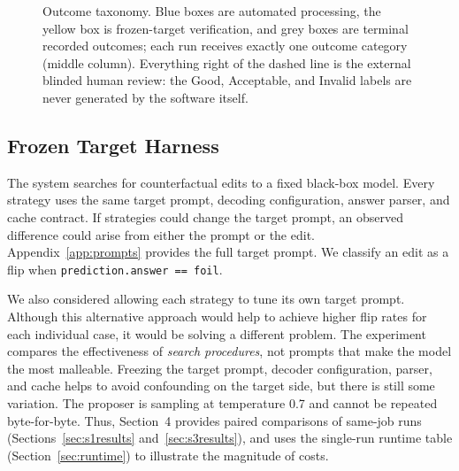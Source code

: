 \documentclass[11pt,a4paper]{article}
\begin{document}
\begin{figure}[htbp]
\caption{Outcome taxonomy. Blue boxes are automated processing, the yellow box is
frozen-target verification, and grey boxes are terminal recorded outcomes; each run
receives exactly one outcome category (middle column). Everything right of the
dashed line is the external blinded human review: the Good, Acceptable, and Invalid
labels are never generated by the software itself.}
\label{fig:taxonomy}
\end{figure}

\subsection{Frozen Target Harness}
\label{sec:harness}

The system searches for counterfactual edits to a fixed black-box model. Every
strategy uses the same target prompt, decoding configuration, answer parser, and
cache contract. If strategies could change the target prompt, an observed difference
could arise from either the prompt or the edit. Appendix~\ref{app:prompts} provides
the full target prompt. We classify an edit as a flip when
\texttt{prediction.answer == foil}.

We also considered allowing each strategy to tune its own target prompt. Although
this alternative approach would help to achieve higher flip rates for each
individual case, it would be solving a different problem. The experiment
compares the effectiveness of \emph{search procedures}, not prompts that make the
model the most malleable. Freezing the target prompt, decoder configuration,
parser, and cache helps to avoid confounding on the target side, but there is still
some variation. The proposer is sampling at temperature 0.7 and cannot be
repeated byte-for-byte. Thus, Section~4 provides paired comparisons of same-job
runs (Sections~\ref{sec:s1results} and~\ref{sec:s3results}), and uses
the single-run runtime table (Section~\ref{sec:runtime}) to illustrate the magnitude
of costs.
\end{document}
